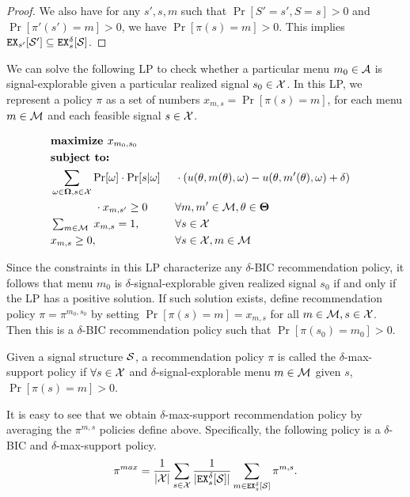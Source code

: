 \begin{proof}
We also have for any $s', s ,m$ such that $\Pr[S' = s',S = s] >0 $ and $\Pr[\pi'(s') = m] >0$, we have $\Pr[\pi(s) = m] > 0$. This implies $\EX_{s'}[\S'] \subseteq \EX^{\delta}_s[\S]$.
\end{proof}


We can solve the following LP to check whether a particular menu $m_0 \in\A$ is signal-explorable given a particular realized signal $s_0\in\X$. In this LP, we represent a policy $\pi$ as a set of numbers
    $x_{m,s} = \Pr[\pi(s)=m]$,
for each menu $m\in \M$ and each feasible signal $s\in \X$.

\begin{figure}[H]
\begin{mdframed}
\begin{alignat*}{2}
 & \textbf{maximize }    x_{m_0,s_0}\  \\
&  \textbf{subject to: }\\
 & \sum_{\omega \in \varOmega, s \in \X} \Pr[\omega] \cdot \Pr[s | \omega] &  & \cdot \left(u(\theta, m(\theta), \omega) - u(\theta, m'(\theta), \omega) + \delta\right)\\
    &\qquad\qquad \cdot x_{m,s'} \geq 0  &\ & \forall m,m' \in \M, \theta \in \varTheta \\
& \textstyle  \sum_{m\in \M}\; x_{m,s} = 1,  \ &\ & \forall s \in \X \\
& x_{m,s} \geq 0,  \ &\ & \forall s \in \X, m\in \M
\end{alignat*}
\end{mdframed}
\label{fig:nocc_lp}
\end{figure}

Since the constraints in this LP characterize any $\delta$-BIC recommendation policy, it follows that menu $m_0$ is $\delta$-signal-explorable given realized signal $s_0$ if and only if the LP has a positive solution. If such solution exists, define recommendation policy $\pi = \pi^{m_0,s_0}$ by setting $\Pr[\pi(s) = m] = x_{m,s}$ for all $m \in \M, s \in \X$. Then this is a $\delta$-BIC recommendation policy such that $\Pr[\pi(s_0) = m_0] > 0$.

\begin{definition}
Given a signal structure $\S$, a recommendation policy $\pi$ is called the $\delta$-max-support policy if $\forall s \in \X$  and $\delta$-signal-explorable menu $m\in \M$ given $s$, $\Pr[\pi(s) = m] > 0$.
\end{definition}

It is easy to see that we obtain $\delta$-max-support recommendation policy by averaging the $\pi^{m,s}$ policies define above.
Specifically, the following policy is a $\delta$-BIC and $\delta$-max-support policy.
\begin{align}
\label{eq:pimax2}
\pi^{max} = \frac{1}{|\X|} \sum_{s \in \X} \frac{1}{|\EX_s^{\delta}[\S]|} \sum_{m \in \EX_s^{\delta}[\S]} \pi^{m,s}.
\end{align}

